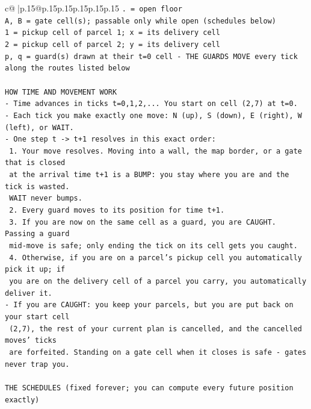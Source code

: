 \documentclass{article}
\begin{document}
{\begin{supertabular}{c@{$\;$}|p{.15\linewidth}@{}p{.15\linewidth}p{.15\linewidth}p{.15\linewidth}p{.15\linewidth}p{.15\linewidth}}
{{{\texttt{. = open floor} \\
\texttt{A, B = gate cell(s); passable only while open (schedules below)} \\
\texttt{1 = pickup cell of parcel 1; x = its delivery cell} \\
\texttt{2 = pickup cell of parcel 2; y = its delivery cell} \\
\texttt{p, q = guard(s) drawn at their t=0 cell {-} THE GUARDS MOVE every tick along the routes listed below} \\
\\ 
\texttt{HOW TIME AND MOVEMENT WORK} \\
\texttt{{-} Time advances in ticks t=0,1,2,... You start on cell (2,7) at t=0.} \\
\texttt{{-} Each tick you make exactly one move: N (up), S (down), E (right), W (left), or WAIT.} \\
\texttt{{-} One step t {-}> t+1 resolves in this exact order:} \\
\texttt{  1. Your move resolves. Moving into a wall, the map border, or a gate that is closed} \\
\texttt{     at the arrival time t+1 is a BUMP: you stay where you are and the tick is wasted.} \\
\texttt{     WAIT never bumps.} \\
\texttt{  2. Every guard moves to its position for time t+1.} \\
\texttt{  3. If you are now on the same cell as a guard, you are CAUGHT. Passing a guard} \\
\texttt{     mid{-}move is safe; only ending the tick on its cell gets you caught.} \\
\texttt{  4. Otherwise, if you are on a parcel's pickup cell you automatically pick it up; if} \\
\texttt{     you are on the delivery cell of a parcel you carry, you automatically deliver it.} \\
\texttt{{-} If you are CAUGHT: you keep your parcels, but you are put back on your start cell} \\
\texttt{  (2,7), the rest of your current plan is cancelled, and the cancelled moves' ticks} \\
\texttt{  are forfeited. Standing on a gate cell when it closes is safe {-} gates never trap you.} \\
\\ 
\texttt{THE SCHEDULES (fixed forever; you can compute every future position exactly)} \\
}}}
\end{supertabular}}
\end{document}

